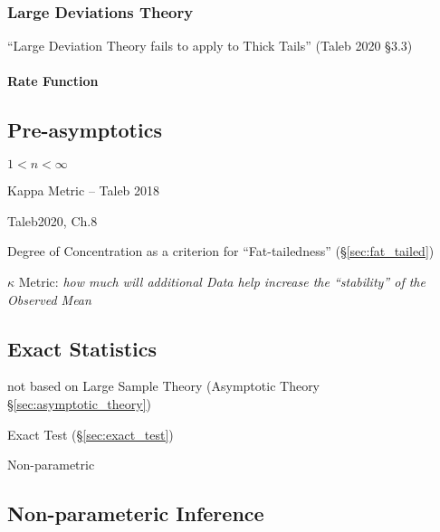 \subsubsection{Large Deviations Theory}\label{sec:large_deviations_theory}

``Large Deviation Theory fails to apply to Thick Tails'' (Taleb 2020 \S 3.3)



\paragraph{Rate Function}\label{sec:rate_function}\hfill



\subsection{Pre-asymptotics}\label{sec:preasymptotics}


$1 < n < \infty$

Kappa Metric -- Taleb 2018

Taleb2020, Ch.8

Degree of Concentration as a criterion for ``Fat-tailedness''
(\S\ref{sec:fat_tailed})

$\kappa$ Metric: \emph{how much will additional Data help increase the
``stability'' of the Observed Mean}



\subsection{Exact Statistics}\label{sec:exact_statistics}

not based on Large Sample Theory (Asymptotic Theory
\S\ref{sec:asymptotic_theory})

\fist Exact Test (\S\ref{sec:exact_test})

Non-parametric



\subsection{Non-parameteric Inference}\label{sec:nonparametric_inference}

